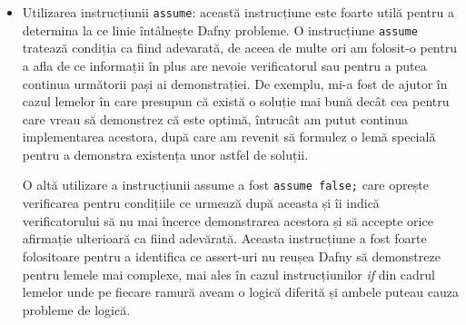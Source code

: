 \begin{sloppypar}
\begin{itemize}
\begin{Verbatim}[commandchars=\\\{\}]
\end{Verbatim}
    se asigură că după apelarea lemei computeGainAdd0 verificatorul știe că profitul unei soluții rămâne neschimbat dacă eliminăm ultimul element de 0 din soluție. \par
    \hspace{2mm} De asemenea, folosind structura \texttt{assert ... by} putem reduce sarcina verificatorului deoarece pașii din acest bloc de instrucțiuni sunt "uitați" după verificarea condiției din assert:
    \begin{Verbatim}[commandchars=\\\{\}]
\PY{k}{assert} \PY{n}{gain}\PY{p}{(}\PY{n}{p}\PY{p}{,} \PY{n}{x}\PY{p}{[}\PY{p}{..}\PY{n}{i} \PY{o}{\PYZhy{}} \PY{l+m+mi}{1}\PY{p}{]}\PY{p}{)} \PY{o}{==} \PY{n}{gain}\PY{p}{(}\PY{n}{p}\PY{p}{,} \PY{n}{solution1}\PY{p}{)} \PY{n}{by}
\PY{p}{\PYZob{}}
  \PY{n}{optimalSolRemove1}\PY{p}{(}\PY{n}{p}\PY{p}{,} \PY{n}{x}\PY{p}{,} \PY{n}{i}\PY{p}{,} \PY{n}{j}\PY{p}{)}\PY{p}{;}
  \PY{k}{assert} \PY{n}{isOptimalPartialSolution}\PY{p}{(}\PY{n}{p}\PY{p}{,} \PY{n}{x}\PY{p}{[}\PY{p}{..}\PY{n}{i} \PY{o}{\PYZhy{}} \PY{l+m+mi}{1}\PY{p}{]}\PY{p}{,} 
    \PY{n}{i} \PY{o}{\PYZhy{}} \PY{l+m+mi}{1}\PY{p}{,} \PY{n}{j} \PY{o}{\PYZhy{}} \PY{n}{p}\PY{p}{.}\PY{n}{weights}\PY{p}{[}\PY{n}{i} \PY{o}{\PYZhy{}} \PY{l+m+mi}{1}\PY{p}{]}\PY{p}{)}\PY{p}{;}
\PY{p}{\PYZcb{}} 
\end{Verbatim}
    \item Utilizarea instrucțiunii \texttt{assume}: această instrucțiune este foarte utilă pentru a determina la ce linie întâlnește Dafny probleme. O instrucțiune \texttt{assume} tratează condiția ca fiind adevarată, de aceea de multe ori am folosit-o pentru a afla de ce informații în plus are nevoie verificatorul sau pentru a putea continua următorii pași ai demonstrației. De exemplu, mi-a fost de ajutor în cazul lemelor în care presupun că există o soluție mai bună decât cea pentru care vreau să demonstrez că este optimă, întrucât am putut continua implementarea acestora, după care am revenit să formulez o lemă specială pentru a demonstra existența unor astfel de soluții. \par
    \hspace{2mm} O altă utilizare a instrucțiunii assume a fost \texttt{assume false;} care oprește verificarea pentru condițiile ce urmează după aceasta și îi indică verificatorului să nu mai încerce demonstrarea acestora și să accepte orice afirmație ulterioară ca fiind adevărată. Aceasta instrucțiune a fost foarte folositoare pentru a identifica ce assert-uri nu reușea Dafny să demonstreze pentru lemele mai complexe, mai ales în cazul instrucțiunilor \textit{if} din cadrul lemelor unde pe fiecare ramură aveam o logică diferită și ambele puteau cauza probleme de logică.

\end{itemize}
\end{sloppypar}
